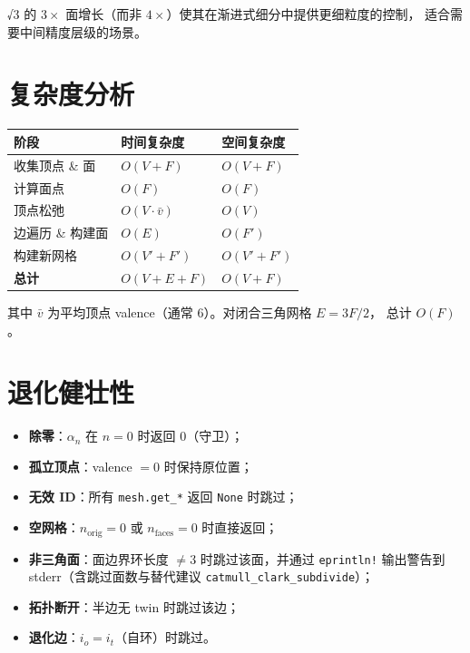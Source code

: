 \documentclass[11pt,a4paper]{article}
\begin{document}
√3 的 $3\times$ 面增长（而非 $4\times$）使其在渐进式细分中提供更细粒度的控制，
适合需要中间精度层级的场景。

\section{复杂度分析}

\begin{center}
\renewcommand{\arraystretch}{1.18}
\begin{tabular}{@{}lll@{}}
  \toprule
  \textbf{阶段} & \textbf{时间复杂度} & \textbf{空间复杂度} \\
  \midrule
  收集顶点 \& 面 & $O(V + F)$ & $O(V + F)$ \\
  计算面点 & $O(F)$ & $O(F)$ \\
  顶点松弛 & $O(V \cdot \bar{v})$ & $O(V)$ \\
  边遍历 \& 构建面 & $O(E)$ & $O(F')$ \\
  构建新网格 & $O(V' + F')$ & $O(V' + F')$ \\
  \midrule
  \textbf{总计} & $O(V + E + F)$ & $O(V + F)$ \\
  \bottomrule
\end{tabular}
\end{center}

其中 $\bar{v}$ 为平均顶点 valence（通常 6）。对闭合三角网格 $E = 3F/2$，
总计 $O(F)$。

\section{退化健壮性}

\begin{itemize}
  \item \textbf{除零}：$\alpha_n$ 在 $n=0$ 时返回 0（守卫）；
  \item \textbf{孤立顶点}：valence $=0$ 时保持原位置；
  \item \textbf{无效 ID}：所有 \texttt{mesh.get\_*} 返回 \texttt{None} 时跳过；
  \item \textbf{空网格}：$n_{\text{orig}}=0$ 或 $n_{\text{faces}}=0$ 时直接返回；
  \item \textbf{非三角面}：面边界环长度 $\neq 3$ 时跳过该面，并通过 \texttt{eprintln!}
        输出警告到 stderr（含跳过面数与替代建议 \texttt{catmull\_clark\_subdivide}）；
  \item \textbf{拓扑断开}：半边无 twin 时跳过该边；
  \item \textbf{退化边}：$i_o = i_t$（自环）时跳过。
\end{itemize}
\end{document}
